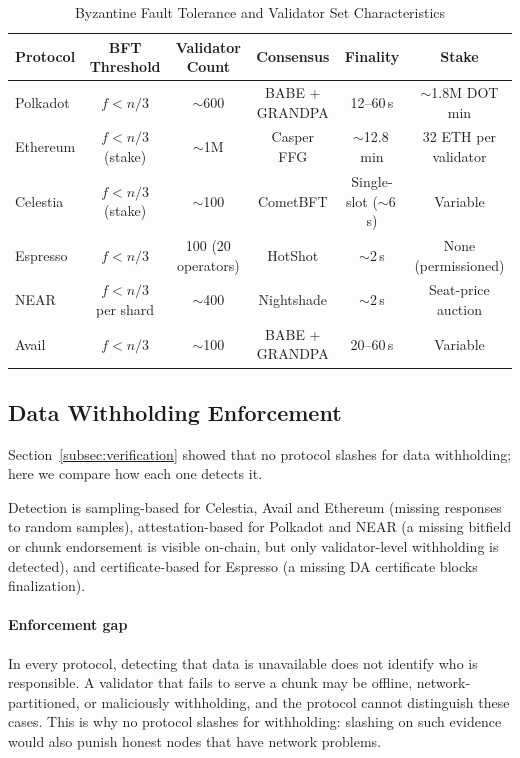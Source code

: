 \begin{table}[t]
\centering
\caption{Byzantine Fault Tolerance and Validator Set Characteristics}
\label{tab:bft_comparison}
\setlength{\tabcolsep}{3pt}
\footnotesize
\begin{tabular}{lccccc}
\toprule
\textbf{Protocol} & \textbf{BFT Threshold} & \textbf{Validator Count} & \textbf{Consensus} & \textbf{Finality} & \textbf{Stake} \\
\midrule
Polkadot & $f < n/3$ & $\sim$600 & BABE + GRANDPA & 12--60\,s & $\sim$1.8M DOT min \\
Ethereum & $f < n/3$ (stake) & $\sim$1M & Casper FFG & $\sim$12.8\,min & 32 ETH per validator \\
Celestia & $f < n/3$ (stake) & $\sim$100 & CometBFT & Single-slot ($\sim$6\,s) & Variable \\
Espresso & $f < n/3$ & 100 (20 operators) & HotShot & $\sim$2\,s & None (permissioned) \\
NEAR & $f < n/3$ per shard & $\sim$400 & Nightshade & $\sim$2\,s & Seat-price auction \\
Avail & $f < n/3$ & $\sim$100 & BABE + GRANDPA & 20--60\,s & Variable \\
\bottomrule
\end{tabular}
\end{table}

\subsection{Data Withholding Enforcement}
\label{sec:security-withholding}

Section~\ref{subsec:verification} showed that no protocol slashes for data withholding; here we compare how each one detects it.

Detection is sampling-based for Celestia, Avail and Ethereum (missing responses to random samples), attestation-based for Polkadot and NEAR (a missing bitfield or chunk endorsement is visible on-chain, but only validator-level withholding is detected), and certificate-based for Espresso (a missing DA certificate blocks finalization).

\paragraph{Enforcement gap}
In every protocol, detecting that data is unavailable does not identify who is responsible.
A validator that fails to serve a chunk may be offline, network-partitioned, or maliciously withholding, and the protocol cannot distinguish these cases.
This is why no protocol slashes for withholding: slashing on such evidence would also punish honest nodes that have network problems.


